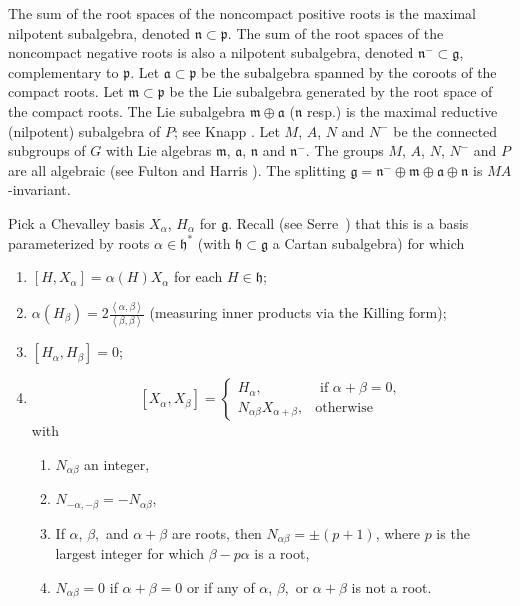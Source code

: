 \documentclass[11pt]{article}
\newcommand{\LieG}{\ensuremath{\mathfrak{g}}}
\newcommand{\LieP}{\ensuremath{\mathfrak{p}}}
\newcommand{\LieM}{\ensuremath{\mathfrak{m}}}
\newcommand{\LieA}{\ensuremath{\mathfrak{a}}}
\newcommand{\LieN}{\ensuremath{\mathfrak{n}}}
\newcommand{\gtot}{\mathfrak{g}}
\newcommand{\cartan}{\ensuremath{\mathfrak{h}}}
\begin{document}
The sum of the root spaces of the noncompact positive roots
is the maximal nilpotent subalgebra, denoted
$\LieN \subset \LieP$.
The sum of the root spaces of the noncompact negative roots
is also a nilpotent subalgebra, denoted
$\LieN^{-} \subset \LieG$, complementary to $\LieP$.
Let $\LieA \subset \LieP$
be the subalgebra spanned by the coroots of the compact roots.
Let $\LieM \subset \LieP$ be the Lie subalgebra generated
by the root space of the compact roots.
The Lie subalgebra
$\LieM \oplus \LieA$ ($\LieN$ resp.)
is the maximal reductive (nilpotent) subalgebra
of $P$; see Knapp \cite{Knapp:2002}.
Let $M$, $A$, $N$ and $N^-$ be the connected subgroups
of $G$ with Lie algebras
$\LieM$, $\LieA$, $\LieN$ and $\LieN^-$.
The groups $M$, $A$, $N$, $N^-$ and $P$
are all algebraic (see Fulton and Harris \cite[p.~382]{Fulton/Harris:1991}).
The splitting
$\LieG = \LieN^{-} \oplus \LieM \oplus \LieA \oplus \LieN$
is $MA$-invariant.

Pick a Chevalley basis $X_{\alpha}$, $H_{\alpha}$
for $\LieG$. Recall (see Serre~\cite{Serre:2001}) that this is a basis
parameterized by roots $\alpha \in \cartan^*$
(with $\cartan \subset \gtot$ a Cartan
subalgebra) for which
\begin{enumerate}\itemsep=0pt
\item $\left[H,X_{\alpha}\right]=\alpha(H) X_{\alpha}$
for each $H \in \cartan$;
\item $\alpha\left(H_{\beta}\right)=
2 \frac{\left<\alpha, \beta\right>}{\left<\beta,\beta\right>}$
(measuring inner products via the Killing form);
\item $\left[H_{\alpha},H_{\beta}\right]=0$;
\item
\[
\left[X_{\alpha},X_{\beta}\right]=
\begin{cases}
H_{\alpha}, & \text{ if } \alpha+\beta=0, \\
N_{\alpha\beta} X_{\alpha+\beta}, & \text{otherwise}
\end{cases}
\]
with
\begin{enumerate}\itemsep=0pt
\item $N_{\alpha\beta}$ an integer,
\item $N_{-\alpha,-\beta}=-N_{\alpha\beta}$,
\item If $\alpha$, $\beta, $ and $\alpha+\beta$ are roots, then
$N_{\alpha\beta}=\pm (p+1)$,
where $p$ is the largest integer for which $\beta-p  \alpha$ is a root,
\item
$N_{\alpha \beta}=0$ if $\alpha+\beta = 0$ or
if any of $\alpha$, $\beta,$ or  $\alpha+\beta$ is not a root.
\end{enumerate}
\end{enumerate}
\end{document}
